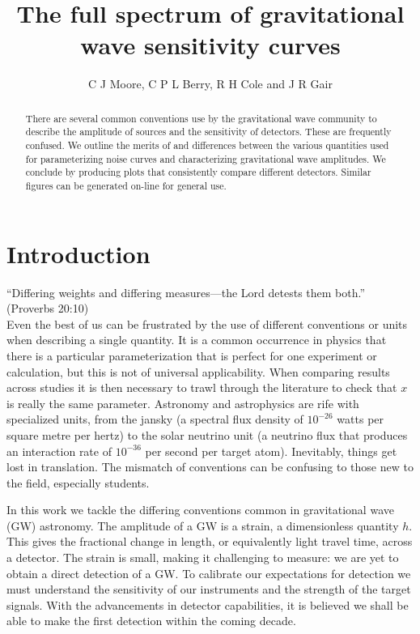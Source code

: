 \documentclass[fleqn,12pt]{iopart}
\begin{document}
\title[GW sensitivity curves]{The full spectrum of gravitational wave sensitivity curves}

\author{C J Moore, C P L Berry, R H Cole and J R Gair}

\address{Institute of Astronomy, Madingley Road, Cambridge, CB3 0DS, United Kingdom}

\begin{abstract}
There are several common conventions use by the gravitational wave community to describe the amplitude of sources and the sensitivity of detectors. These are frequently confused. We outline the merits of and differences between the various quantities used for parameterizing noise curves and characterizing gravitational wave amplitudes. We conclude by producing plots that consistently compare different detectors. Similar figures can be generated on-line for general use.
\end{abstract}

\submitto{\CQG}
\maketitle

\section{Introduction}

``Differing weights and differing measures---the {\sc Lord} detests them both.'' (Proverbs 20:10)\\

\noindent{}Even the best of us can be frustrated by the use of different conventions or units when describing a single quantity. It is a common occurrence in physics that  there is a particular parameterization that is perfect for one experiment or calculation, but this is not of universal applicability. When comparing results across studies it is then necessary to trawl through the literature to check that $x$ is really the same parameter. Astronomy and astrophysics are rife with specialized units, from the jansky (a spectral flux density of $10^{-26}$ watts per square metre per hertz) to the solar neutrino unit (a neutrino flux that produces an interaction rate of $10^{-36}$ per second per target atom). Inevitably, things get lost in translation. The mismatch of conventions can be confusing to those new to the field, especially students.

In this work we tackle the differing conventions common in gravitational wave (GW) astronomy. The amplitude of a GW is a strain, a dimensionless quantity $h$. This gives the fractional change in length, or equivalently light travel time, across a detector. The strain is small, making it challenging to measure: we are yet to obtain a direct detection of a GW. To calibrate our expectations for detection we must understand the sensitivity of our instruments and the strength of the target signals. With the advancements in detector capabilities, it is believed we shall be able to make the first detection within the coming decade.
\end{document}
